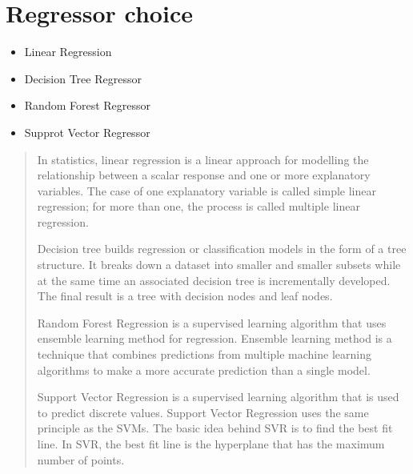 \documentclass[letterpaper,10pt,english]{sphinxmanual}
\begin{document}
\chapter{Regressor choice}
\label{\detokenize{index:regressor-choice}}\begin{quote}\begin{description}
\end{description}\end{quote}
\begin{itemize}
\item {} 
\sphinxAtStartPar
Linear Regression

\item {} 
\sphinxAtStartPar
Decision Tree Regressor

\item {} 
\sphinxAtStartPar
Random Forest Regressor

\item {} 
\sphinxAtStartPar
Supprot Vector Regressor

\end{itemize}
\begin{quote}\begin{description}
\sphinxAtStartPar
In statistics, linear regression is a linear approach for modelling the relationship between a scalar response and one or more explanatory variables. The case of one explanatory variable is called simple linear regression; for more than one, the process is called multiple linear regression.

\sphinxAtStartPar
Decision tree builds regression or classification models in the form of a tree structure. It breaks down a dataset into smaller and smaller subsets while at the same time an associated decision tree is incrementally developed. The final result is a tree with decision nodes and leaf nodes.

\sphinxAtStartPar
Random Forest Regression is a supervised learning algorithm that uses ensemble learning method for regression. Ensemble learning method is a technique that combines predictions from multiple machine learning algorithms to make a more accurate prediction than a single model.

\sphinxAtStartPar
Support Vector Regression is a supervised learning algorithm that is used to predict discrete values. Support Vector Regression uses the same principle as the SVMs. The basic idea behind SVR is to find the best fit line. In SVR, the best fit line is the hyperplane that has the maximum number of points.

\end{description}\end{quote}
\end{document}
